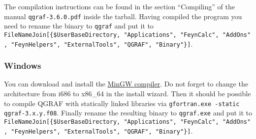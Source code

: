 \documentclass[../FeynHelpersManual.tex]{subfiles}
\begin{document}
The compilation instructions can be found in the section ``Compiling''
of the manual \texttt{qgraf-3.6.0.pdf} inside the tarball. Having
compiled the program you need to rename the binary to \texttt{qgraf} and
put it to
\texttt{FileNameJoin[\allowbreak{}\{\allowbreak{}\$UserBaseDirectory,\ \allowbreak{}"Applications",\ \allowbreak{}"FeynCalc",\ \allowbreak{}"AddOns",\ \allowbreak{}"FeynHelpers",\ \allowbreak{}"ExternalTools",\ \allowbreak{}"QGRAF",\ \allowbreak{}"Binary"\}]}.

\hypertarget{windows-4}{%
\subsubsection{Windows}\label{windows-4}}

You can download and install the
\href{https://sourceforge.net/projects/mingw-w64/files/mingw-w64}{MinGW
compiler}. Do not forget to change the architecture from i686 to x86\_64
in the install wizard. Then it should be possible to compile QGRAF with
statically linked libraries via
\texttt{gfortran.exe -static qgraf-3.x.y.f08}. Finally rename the
resulting binary to \texttt{qgraf.exe} and put it to
\texttt{FileNameJoin[\allowbreak{}\{\allowbreak{}\$UserBaseDirectory,\ \allowbreak{}"Applications",\ \allowbreak{}"FeynCalc",\ \allowbreak{}"AddOns",\ \allowbreak{}"FeynHelpers",\ \allowbreak{}"ExternalTools",\ \allowbreak{}"QGRAF",\ \allowbreak{}"Binary"\}]}.
\end{document}
